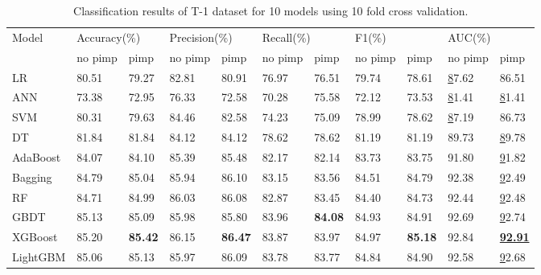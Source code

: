 \documentclass[review]{elsarticle}
\begin{document}
\begin{table}[H]\footnotesize
    \centering
    \caption{Classification results of T-1 dataset for 10 models using 10 fold cross validation.}
    \label{Classification results 1}
    \begin{tabular}{lllllllllll}
    \hline
    \multirow{2}{*}{Model} & \multicolumn{2}{l}{Accuracy(\%)} & \multicolumn{2}{l}{Precision(\%)} & \multicolumn{2}{l}{Recall(\%)} & \multicolumn{2}{l}{F1(\%)} & \multicolumn{2}{l}{AUC(\%)} \\ \cline{2-11}
     & no pimp & pimp & no pimp & pimp & no pimp & pimp & no pimp & pimp & no pimp & pimp \\ \hline
    LR & 80.51 & 79.27 & 82.81 & 80.91 & 76.97 & 76.51 & 79.74 & 78.61 & {\ul 87.62} & 86.51 \\
    ANN & 73.38 & 72.95 & 76.33 & 72.58 & 70.28 & 75.58 & 72.12 & 73.53 & {\ul 81.41} & {\ul 81.41} \\
    SVM & 80.31 & 79.63 & 84.46 & 82.58 & 74.23 & 75.09 & 78.99 & 78.62 & {\ul 87.19} & 86.73 \\
    DT & 81.84 & 81.84 & 84.12 & 84.12 & 78.62 & 78.62 & 81.19 & 81.19 & 89.73 & {\ul 89.78} \\
    AdaBoost & 84.07 & 84.10 & 85.39 & 85.48 & 82.17 & 82.14 & 83.73 & 83.75 & 91.80 & {\ul 91.82} \\
    Bagging & 84.79 & 85.04 & 85.94 & 86.10 & 83.15 & 83.56 & 84.51 & 84.79 & 92.38 & {\ul 92.49} \\
    RF & 84.71 & 84.99 & 86.03 & 86.08 & 82.87 & 83.45 & 84.40 & 84.73 & 92.44 & {\ul 92.48} \\
    GBDT & 85.13 & 85.09 & 85.98 & 85.80 & 83.96 & \textbf{84.08} & 84.93 & 84.91 & 92.69 & {\ul 92.74} \\
    XGBoost & 85.20 & \textbf{85.42} & 86.15 & \textbf{86.47} & 83.87 & 83.97 & 84.97 & \textbf{85.18} & 92.84 & {\ul \textbf{92.91}} \\
    LightGBM & 85.06 & 85.13 & 85.97 & 86.09 & 83.78 & 83.77 & 84.84 & 84.90 & 92.58 & {\ul 92.68} \\ \hline
    \end{tabular}
\end{table}
\end{document}
